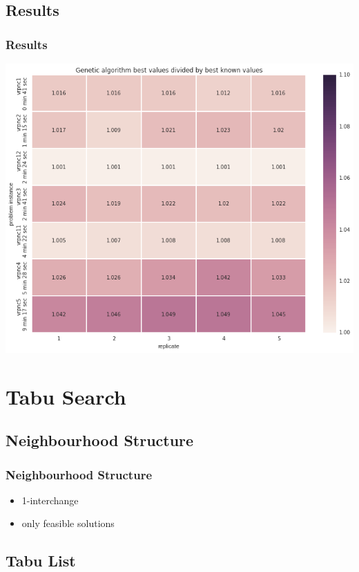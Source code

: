 \documentclass{beamer}
\begin{document}
\subsection{Results}
\begin{frame}
\frametitle{Results}
\begin{center}
\includegraphics[scale=0.25]{figs/ga_best}

\end{center}
\end{frame}

\section{Tabu Search}



\subsection{Neighbourhood Structure}

\begin{frame}
\frametitle{Neighbourhood Structure}
\begin{itemize}
	\item 1-interchange
	\item only feasible solutions
\end{itemize}
\end{frame}


\subsection{Tabu List}
\end{document}
